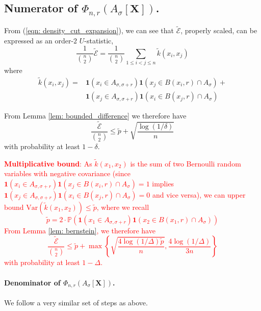 \documentclass{article}
\newcommand{\Asig}{A_{\sigma}}
\newcommand{\Asigr}{A_{\sigma,\sigma + r}}
\newcommand{\1}{\mathbf{1}}
\newcommand{\var}{\mathrm{Var}}
\theoremstyle{aldenthm}
\begin{document}
\subsection{Numerator of $\Phi_{n,r}(\Asig[\mathbf{X}])$.}
From (\ref{eqn: density_cut_expansion}), we can see that $\widetilde{\mathcal{E}}$, properly scaled, can be expressed as an order-$2$ $U$-statistic,
\begin{equation*}
\frac{1}{{n \choose 2}}\widetilde{\mathcal{E}} = \frac{1}{{n \choose 2}} \sum_{1 \leq i < j \leq n} \widetilde{k}(x_i, x_j)
\end{equation*}
where 
\begin{align*}
\tilde{k}(x_i,x_j) = & \1(x_i \in \Asigr) \1(x_j \in B(x_i,r) \cap \Asig) + \\
& \1(x_j \in \Asigr) \1(x_i \in B(x_j,r) \cap \Asig)
\end{align*}

From Lemma \ref{lem: bounded_difference} we therefore have
\begin{equation}
\label{eqn: numerator_additive_bound}
\frac{\widetilde{\mathcal{E}}}{{n \choose 2}} \leq \widetilde{p} + \sqrt{\frac{\log(1/\delta)}{n}}
\end{equation}
with probability at least $1 - \delta$. 


\textcolor{red}{\textbf{Multiplicative bound}: As $\tilde{k}(x_1,x_2)$ is the sum of two Bernoulli random variables with negative covariance (since $\1(x_i \in \Asigr) \1(x_j \in B(x_i,r) \cap \Asig) = 1$ implies $\1(x_j \in \Asigr) \1(x_i \in B(x_j,r) \cap \Asig) = 0$ and vice versa), we can upper bound $\var\left(\tilde{k}(x_1, x_2)\right) \leq  \widetilde{p}$, where we recall 
\begin{equation*}
\widetilde{p} = 2\cdot \mathbb{P}\left(\1(x_1 \in \Asigr) \1(x_2 \in B(x_1,r) \cap \Asig)\right)
\end{equation*}
From Lemma \ref{lem: bernstein}, we therefore have
\begin{equation*}
\frac{\widetilde{\mathcal{E}}}{{n \choose 2}} \leq \widetilde{p} + \max\left\{ \sqrt{\frac{4\log(1/\Delta)\widetilde{p}}{n}}, \frac{4 \log(1/\Delta)}{3n} \right\}
\end{equation*}
with probability at least $1 - \Delta$.}

\paragraph{Denominator of $\Phi_{n,r}(\Asig[\mathbf{X}])$.}
We follow a very similar set of steps as above.
\end{document}
